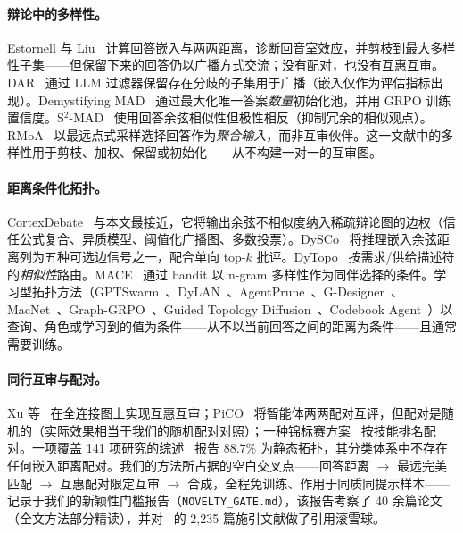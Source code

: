\documentclass[UTF8,11pt]{ctexart}
\begin{document}
\paragraph{辩论中的多样性。}
Estornell 与 Liu~\cite{estornell2024multillm} 计算回答嵌入与两两距离，诊断回音室效应，并剪枝到最大多样性子集——但保留下来的回答仍以广播方式交流；没有配对，也没有互惠互审。DAR~\cite{nguyen2026dars} 通过 LLM 过滤器保留存在分歧的子集用于广播（嵌入仅作为评估指标出现）。Demystifying MAD~\cite{zhu2026demystifying} 通过最大化唯一答案\emph{数量}初始化池，并用 GRPO 训练置信度。S$^2$-MAD~\cite{zeng2025s2mad} 使用回答余弦相似性但极性相反（抑制冗余的相似观点）。RMoA~\cite{rmoa2025} 以最远点式采样选择回答作为\emph{聚合输入}，而非互审伙伴。这一文献中的多样性用于剪枝、加权、保留或初始化——从不构建一对一的互审图。

\paragraph{距离条件化拓扑。}
CortexDebate~\cite{cortexdebate2025} 与本文最接近，它将输出余弦不相似度纳入稀疏辩论图的边权（信任公式复合、异质模型、阈值化广播图、多数投票）。DySCo~\cite{dysco2026} 将推理嵌入余弦距离列为五种可选边信号之一，配合单向 top-$k$ 批评。DyTopo~\cite{dytopo2026} 按需求/供给描述符的\emph{相似性}路由。MACE~\cite{mace2026} 通过 bandit 以 n-gram 多样性作为同伴选择的条件。学习型拓扑方法（GPTSwarm~\cite{gptswarm}、DyLAN~\cite{dylan}、AgentPrune~\cite{agentprune}、G-Designer~\cite{gdesigner}、MacNet~\cite{macnet}、Graph-GRPO~\cite{graphgrpo}、Guided Topology Diffusion~\cite{gtd2025}、Codebook Agent~\cite{codebookagent}）以查询、角色或学习到的值为条件——从不以当前回答之间的距离为条件——且通常需要训练。

\paragraph{同行互审与配对。}
Xu 等~\cite{xu2023peerreview} 在全连接图上实现互惠互审；PiCO~\cite{pico2024} 将智能体两两配对互评，但配对是随机的（实际效果相当于我们的随机配对对照）；一种锦标赛方案~\cite{qdtournament} 按技能排名配对。一项覆盖 141 项研究的综述~\cite{madsurvey2026} 报告 $88.7\%$ 为静态拓扑，其分类体系中不存在任何嵌入距离配对。我们的方法所占据的空白交叉点——回答距离 $\rightarrow$ 最远完美匹配 $\rightarrow$ 互惠配对限定互审 $\rightarrow$ 合成，全程免训练、作用于同质同提示样本——记录于我们的新颖性门槛报告（\texttt{NOVELTY\_GATE.md}），该报告考察了 40 余篇论文（全文方法部分精读），并对~\cite{du2023multiagent} 的 2{,}235 篇施引文献做了引用滚雪球。
\end{document}
